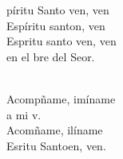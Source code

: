 \documentclass[12pt]{article}
\begin{document}
\begin{multicols*}{2}
\begin{cancion}%
	\begin{chorus}%
	píritu Santo ven, ven\\
	Espíritu santon, ven\\
	Espritu santo ven, ven\\
	en el bre del Seor.\\
	\end{chorus}%
	\jump\\
	Acompñame, imíname\\
	a mi v.\\
	Acomñame, ilíname \\
	Esritu Santoen, ven.\\
\end{cancion}%


\end{multicols*}
\end{document}
